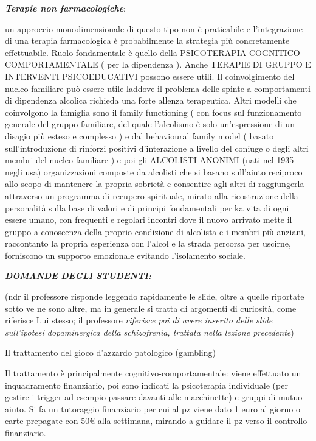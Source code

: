 \documentclass[]{article}
\newcommand{\euro}{€}
\begin{document}
\textbf{\emph{Terapie non farmacologiche}}:

un approccio monodimensionale di questo tipo non è praticabile e
l'integrazione di una terapia farmacologica è probabilmente la strategia
più concretamente effettuabile. Ruolo fondamentale è quello della
PSICOTERAPIA COGNITICO COMPORTAMENTALE ( per la dipendenza ). Anche
TERAPIE DI GRUPPO E INTERVENTI PSICOEDUCATIVI possono essere utili. Il
coinvolgimento del nucleo familiare può essere utile laddove il problema
delle spinte a comportamenti di dipendenza alcolica richieda una forte
allenza terapeutica. Altri modelli che coinvolgono la famiglia sono il
family functioning ( con focus sul funzionamento generale del gruppo
familiare, del quale l'alcolismo è solo un'espressione di un disagio più
esteso e complesso ) e dal behavioural family model ( basato
sull'introduzione di rinforzi positivi d'interazione a livello del
coniuge o degli altri membri del nucleo familiare ) e poi gli ALCOLISTI
ANONIMI (nati nel 1935 negli usa) organizzazioni composte da alcolisti
che si basano sull'aiuto reciproco allo scopo di mantenere la propria
sobrietà e consentire agli altri di raggiungerla attraverso un programma
di recupero spirituale, mirato alla ricostruzione della personalità
sulla base di valori e di principi fondamentali per ka vita di ogni
essere umano, con frequenti e regolari incontri dove il nuovo arrivato
mette il gruppo a conoscenza della proprio condizione di alcolista e i
membri più anziani, raccontanto la propria esperienza con l'alcol e la
strada percorsa per uscirne, forniscono un supporto emozionale evitando
l'isolamento sociale.

\textbf{\emph{DOMANDE DEGLI STUDENTI:}}

(ndr il professore risponde leggendo rapidamente le slide, oltre a
quelle riportate sotto ve ne sono altre, ma in generale si tratta di
argomenti di curiosità, come riferisce Lui stesso; il professore
\emph{riferisce poi di avere inserito delle slide sull'ipotesi
dopaminergica della schizofrenia, trattata nella lezione precedente})

Il trattamento del gioco d'azzardo patologico (gambling)

Il trattamento è principalmente cognitivo-comportamentale: viene
effettuato un inquadramento finanziario, poi sono indicati la
psicoterapia individuale (per gestire i trigger ad esempio passare
davanti alle macchinette) e gruppi di mutuo aiuto. Si fa un tutoraggio
finanziario per cui al pz viene dato 1 euro al giorno o carte prepagate
con 50\euro{} alla settimana, mirando a guidare il pz verso il controllo
finanziario.
\end{document}
